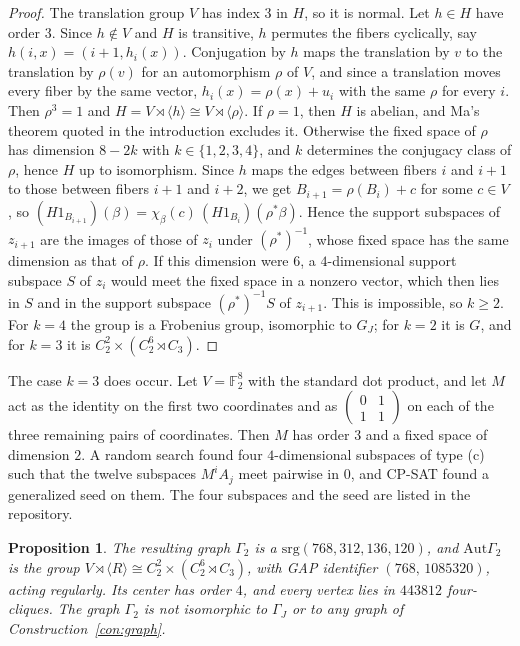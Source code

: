 \documentclass[11pt]{amsart}
\newtheorem{proposition}[theorem]{Proposition}
\theoremstyle{definition}
\newcommand{\F}{\mathbb{F}}
\newcommand{\srg}{\mathrm{srg}}
\newcommand{\Aut}{\mathrm{Aut}}
\begin{document}
\begin{proof}
The translation group $V$ has index $3$ in $H$, so it is normal. Let $h\in H$ have order $3$. Since $h\notin V$ and $H$ is transitive, $h$ permutes the fibers cyclically, say $h(i,x)=(i+1,h_i(x))$. Conjugation by $h$ maps the translation by $v$ to the translation by $\rho(v)$ for an automorphism $\rho$ of $V$, and since a translation moves every fiber by the same vector, $h_i(x)=\rho(x)+u_i$ with the same $\rho$ for every $i$. Then $\rho^3=1$ and $H=V\rtimes\langle h\rangle\cong V\rtimes\langle\rho\rangle$. If $\rho=1$, then $H$ is abelian, and Ma's theorem quoted in the introduction excludes it. Otherwise the fixed space of $\rho$ has dimension $8-2k$ with $k\in\{1,2,3,4\}$, and $k$ determines the conjugacy class of $\rho$, hence $H$ up to isomorphism. Since $h$ maps the edges between fibers $i$ and $i+1$ to those between fibers $i+1$ and $i+2$, we get $B_{i+1}=\rho(B_i)+c$ for some $c\in V$, so $(H1_{B_{i+1}})(\beta)=\chi_\beta(c)\,(H1_{B_i})(\rho^*\beta)$. Hence the support subspaces of $z_{i+1}$ are the images of those of $z_i$ under $(\rho^*)^{-1}$, whose fixed space has the same dimension as that of $\rho$. If this dimension were $6$, a $4$-dimensional support subspace $S$ of $z_i$ would meet the fixed space in a nonzero vector, which then lies in $S$ and in the support subspace $(\rho^*)^{-1}S$ of $z_{i+1}$. This is impossible, so $k\ge2$. For $k=4$ the group is a Frobenius group, isomorphic to $G_J$; for $k=2$ it is $G$, and for $k=3$ it is $C_2^2\times(C_2^6\rtimes C_3)$.
\end{proof}

The case $k=3$ does occur. Let $V=\F_2^8$ with the standard dot product, and let $M$ act as the identity on the first two coordinates and as $\left(\begin{smallmatrix}0&1\\1&1\end{smallmatrix}\right)$ on each of the three remaining pairs of coordinates. Then $M$ has order $3$ and a fixed space of dimension $2$. A random search found four $4$-dimensional subspaces of type (c) such that the twelve subspaces $M^iA_j$ meet pairwise in $0$, and CP-SAT found a generalized seed on them. The four subspaces and the seed are listed in the repository.

\begin{proposition}\label{prop:dim2}
The resulting graph $\Gamma_2$ is a $\srg(768,312,136,120)$, and $\Aut\Gamma_2$ is the group $V\rtimes\langle R\rangle\cong C_2^2\times(C_2^6\rtimes C_3)$, with GAP identifier $(768,\,1085320)$, acting regularly. Its center has order $4$, and every vertex lies in $443812$ four-cliques. The graph $\Gamma_2$ is not isomorphic to $\Gamma_J$ or to any graph of Construction~\ref{con:graph}.
\end{proposition}
\end{document}
